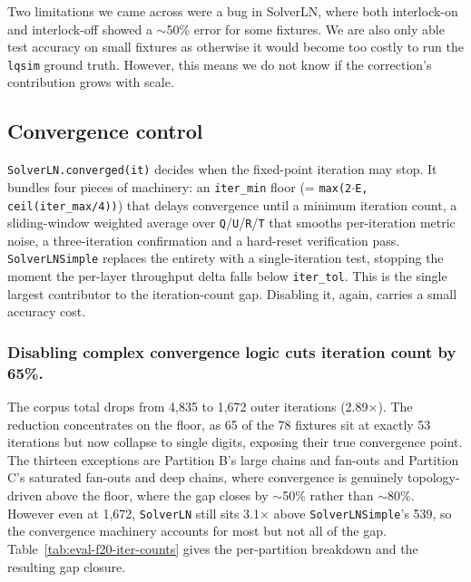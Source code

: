 Two limitations we came across were a bug in SolverLN, where both interlock-on and interlock-off showed a $\sim$50\% error for some fixtures. We are also only able test accuracy on small fixtures as otherwise it would become too costly to run the \texttt{lqsim} ground truth. However, this means we do not know if the correction's contribution grows with scale.



\subsection{Convergence control}
\label{sec:eval-f20}
\label{sec:eval-iter-min}

\texttt{SolverLN.converged(it)} decides when the fixed-point iteration may stop. It bundles four pieces of machinery: an \texttt{iter\_min} floor (= \texttt{max(2$\cdot$E, ceil(iter\_max/4))}) that delays convergence until a minimum iteration count, a sliding-window weighted average over \texttt{Q}/\texttt{U}/\texttt{R}/\texttt{T} that smooths per-iteration metric noise, a three-iteration confirmation and a hard-reset verification pass. \texttt{SolverLNSimple} replaces the entirety with a single-iteration test, stopping the moment the per-layer throughput delta falls below \texttt{iter\_tol}. This is the single largest contributor to the iteration-count gap. Disabling it, again, carries a small accuracy cost.

\subsubsection*{Disabling complex convergence logic cuts iteration count by 65\%.} 
The corpus total drops from 4,835 to 1,672 outer iterations (2.89$\times$). The reduction concentrates on the floor, as 65 of the 78 fixtures sit at exactly 53 iterations but now collapse to single digits, exposing their true convergence point. The thirteen exceptions are Partition B's large chains and fan-outs and Partition C's saturated fan-outs and deep chains, where convergence is genuinely topology-driven above the floor, where the gap closes by $\sim$50\% rather than $\sim$80\%. However even at 1,672, \texttt{SolverLN} still sits 3.1$\times$ above \texttt{SolverLNSimple}'s 539, so the convergence machinery accounts for most but not all of the gap. Table~\ref{tab:eval-f20-iter-counts} gives the per-partition breakdown and the resulting gap closure.

